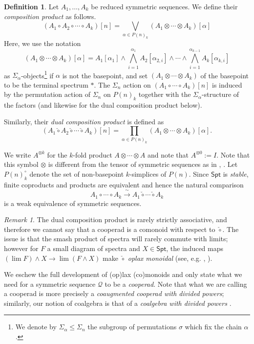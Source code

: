 \documentclass[12pt]{amsart}
\theoremstyle{definition}
\newtheorem{definition}[subsection]{Definition}
\theoremstyle{remark}
\newtheorem{remark}[subsection]{Remark}
\newcommand{\Spt}{\mathsf{Spt}}
\newcommand{\Cal}[1]{\mathcal{#1}}
\newcommand{\ccirc}{\check{\circ}}
\begin{document}
\begin{definition} \label{comp-prod} Let $A_1,\dots,A_k$ be reduced symmetric sequences. We define their \textit{composition product} as follows.
\[(A_1{\circ} A_2 {\circ} \cdots {\circ} A_k)[n]=\bigvee_{\alpha\in P(n)_k} (A_1 \otimes \cdots \otimes A_k)[\alpha] \]
Here, we use the notation \[
    (A_1 \otimes \cdots \otimes A_k)[\alpha]=
        A_1[\alpha_1] \wedge \bigwedge_{i=1}^{\alpha_1} A_2[\alpha_{2,i}] \wedge \cdots \wedge \bigwedge_{i=1}^{\alpha_{k-1}} A_k[\alpha_{k,i}]
        \]  as $\Sigma_{\alpha}$-objects\footnote{We denote by $\Sigma_{\alpha}\leq \Sigma_n$ the subgroup of permutations $\sigma$ which fix the chain $\alpha$.} if $\alpha$ is not the basepoint, and set $(A_1\otimes \cdots \otimes A_k)$ of the basepoint to be the terminal spectrum $*$. The $\Sigma_n$ action on $(A_1\circ \cdots \circ A_k)[n]$ is induced by the permutation action of $\Sigma_n$ on $P(n)_k$ together with the $\Sigma_{\alpha}$-structure of the factors (and likewise for the dual composition product below).

Similarly, their \textit{dual composition product} is defined as \[ (A_1\ccirc A_2 \ccirc \cdots \ccirc A_k)[n]=\prod_{\alpha \in P(n)_k} (A_1 \otimes \cdots \otimes A_k)[\alpha]. \]
\end{definition}

We write $A^{\otimes k}$ for the $k$-fold product $A\otimes \cdots \otimes A$ and note that $A^{\otimes 0}:= I$. Note that this symbol $\otimes$ is different from the tensor of symmetric sequences as in \cite{Rezk-thesis}, \cite{Har-1}. Let $P(n)^{\circ}_k$ denote the set of non-basepoint $k$-simplices of $P(n)$. Since $\Spt$ is \textit{stable}, finite coproducts and products are equivalent and hence the natural comparison \begin{equation} \label{comp} A_1{\circ} \cdots {\circ} A_k\xrightarrow{\;\sim\;} A_1\ccirc \cdots \ccirc A_k\end{equation} is a weak equivalence of symmetric sequences. 

\begin{remark} 
The dual composition product is rarely strictly associative, and therefore we cannot say that a cooperad is a comonoid with respect to $\ccirc$. The issue is that the smash product of spectra will rarely commute with limits; however for $F$ a small diagram of spectra and $X \in \Spt$, the induced maps  $(\lim F ) \wedge X\to \lim ( F\wedge X)$ make $\ccirc$ \textit{oplax monoidal} (see, e.g. \cite{Day-St}, \cite{Ching-oplax}). 

We eschew the full development of (op)lax (co)monoids and only state what we need for a symmetric sequence $\Cal{Q}$ to be a \textit{cooperad}. Note that what we are calling a cooperad is more precisely a \textit{coaugmented cooperad with divided powers}; similarly, our notion of coalgebra is that of a \textit{coalgebra with divided powers} \cite{FG}.
\end{remark} 
\end{document}
